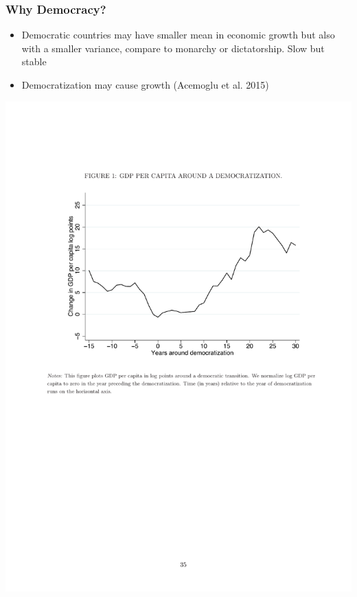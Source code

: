 \documentclass[12pt, xcolor=dvipsnames]{beamer}
\begin{document}
\begin{frame}
\frametitle{\bf Why Democracy?}
\begin{itemize}
\item Democratic countries may have smaller mean in economic growth but also with a smaller variance, compare to monarchy or dictatorship. Slow but stable
\item Democratization may cause growth (Acemoglu et al. 2015)
\end{itemize}
\end{frame}

\begin{frame}
\begin{center}
\includegraphics[width=.9\linewidth]{figures/growth.pdf}
\end{center}
\end{frame}
\end{document}
